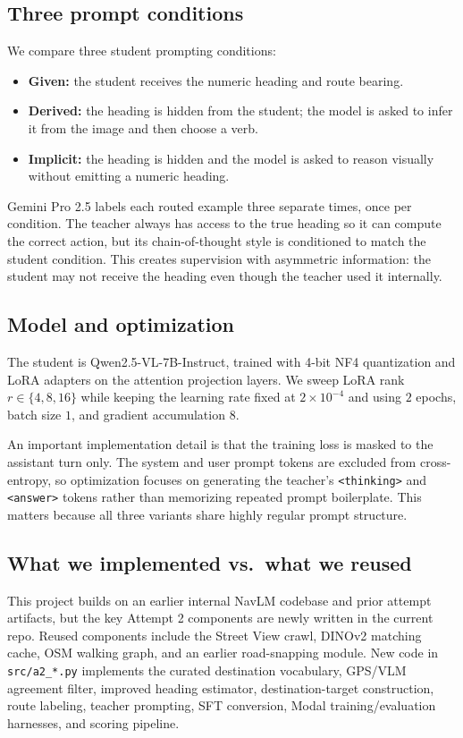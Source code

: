 \documentclass[10pt,twocolumn,letterpaper]{article}
\begin{document}
\subsection{Three prompt conditions}
We compare three student prompting conditions:
\begin{itemize}
\item \textbf{Given:} the student receives the numeric heading and route bearing.
\item \textbf{Derived:} the heading is hidden from the student; the model is asked to infer it from the image and then choose a verb.
\item \textbf{Implicit:} the heading is hidden and the model is asked to reason visually without emitting a numeric heading.
\end{itemize}

Gemini Pro 2.5 labels each routed example three separate times, once per condition. The teacher always has access to the true heading so it can compute the correct action, but its chain-of-thought style is conditioned to match the student condition. This creates supervision with asymmetric information: the student may not receive the heading even though the teacher used it internally.

\subsection{Model and optimization}
The student is Qwen2.5-VL-7B-Instruct, trained with 4-bit NF4 quantization and LoRA adapters on the attention projection layers. We sweep LoRA rank $r \in \{4,8,16\}$ while keeping the learning rate fixed at $2\times10^{-4}$ and using $2$ epochs, batch size $1$, and gradient accumulation $8$.

An important implementation detail is that the training loss is masked to the assistant turn only. The system and user prompt tokens are excluded from cross-entropy, so optimization focuses on generating the teacher's \texttt{<thinking>} and \texttt{<answer>} tokens rather than memorizing repeated prompt boilerplate. This matters because all three variants share highly regular prompt structure.

\subsection{What we implemented vs.\ what we reused}
This project builds on an earlier internal NavLM codebase and prior attempt artifacts, but the key Attempt 2 components are newly written in the current repo. Reused components include the Street View crawl, DINOv2 matching cache, OSM walking graph, and an earlier road-snapping module. New code in \texttt{src/a2\_*.py} implements the curated destination vocabulary, GPS/VLM agreement filter, improved heading estimator, destination-target construction, route labeling, teacher prompting, SFT conversion, Modal training/evaluation harnesses, and scoring pipeline.
\end{document}
